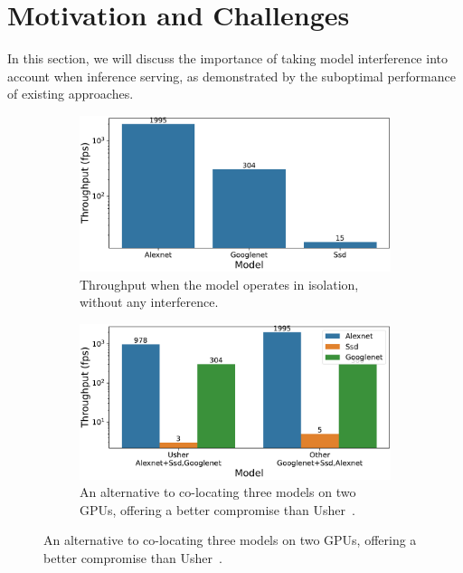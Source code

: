 \section{Motivation and Challenges}\label{sec:motivation}


In this section, we will discuss the importance of taking model interference into account when inference serving, as demonstrated by the suboptimal performance of existing approaches.

\begin{figure}
	\centering
	\begin{subfigure}[t]{0.45\textwidth}
		\centering
		\includegraphics[width=\textwidth]{chapters/roomie/images/Throughput_models_in_isolation.pdf}
		\caption{Throughput when the model operates in isolation, without any interference.}
		\label{fig:isolation}
	\end{subfigure}
	\hfill
	\begin{subfigure}[t]{0.45\textwidth}
		\centering
		\includegraphics[width=\textwidth]{chapters/roomie/images/Throughput_models_in_combinaison.pdf}
		\caption{An alternative to co-locating three models on two GPUs, offering a better compromise than Usher~\cite{shubha2024usher}.}
		\label{fig:colocation}
	\end{subfigure}
	\label{fig:three graphs}
\end{figure}

